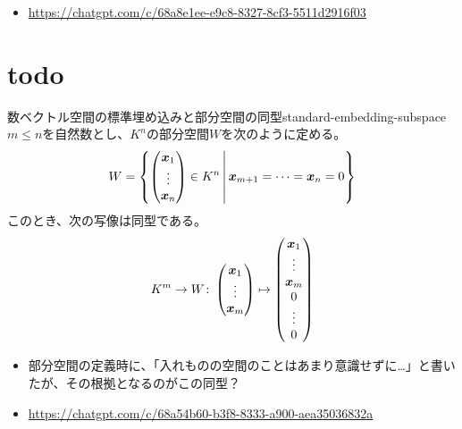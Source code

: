 \documentclass[../../../topic_linear-algebra]{subfiles}
\begin{document}
\begin{mindflow}
  \begin{itemize}
    \item \url{https://chatgpt.com/c/68a8e1ee-e9c8-8327-8cf3-5511d2916f03}
  \end{itemize}
\end{mindflow}

\sectionline
\section{todo}

\begin{theorem}{数ベクトル空間の標準埋め込みと部分空間の同型}{standard-embedding-subspace}
  $m \leq n$を自然数とし、$K^n$の部分空間$W$を次のように定める。
  \begin{equation*}
    W = \left\{ \begin{pmatrix}
      \vb*{x}_1 \\ \vdots \\ \vb*{x}_n
    \end{pmatrix} \in K^n \,\middle|\,
    \begin{gathered} 
      \vb*{x}_{m+1} = \cdots = \vb*{x}_n = 0
    \end{gathered}
    \right\}
  \end{equation*}
  このとき、次の写像は同型である。
  \begin{equation*}
    K^m \to W \colon \begin{pmatrix}
      \vb*{x}_1 \\ \vdots \\ \vb*{x}_m
    \end{pmatrix} \mapsto \begin{pmatrix}
      \vb*{x}_1 \\ \vdots \\ \vb*{x}_m \\ 0 \\ \vdots \\ 0
    \end{pmatrix}
  \end{equation*}
\end{theorem}

\begin{mindflow}
  \begin{itemize}
    \item 部分空間の定義時に、「入れものの空間のことはあまり意識せずに…」と書いたが、その根拠となるのがこの同型？
    \item \url{https://chatgpt.com/c/68a54b60-b3f8-8333-a900-aea35036832a}
  \end{itemize}
\end{mindflow}
\end{document}
